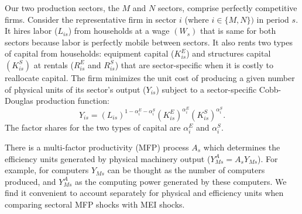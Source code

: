 \documentclass[12pt,fleqn]{article}
\begin{document}
{\normalsize Our two production sectors, the $M$ and $N$ sectors, comprise perfectly competitive firms. Consider the
representative firm in sector $i$ (where $i\in \{M,N\})$ in period $s$. It
hires labor ($L_{is}$) from households at a wage $\left( W_{s}\right) $ that
is same for both sectors because labor is perfectly mobile between sectors.
It also rents two types of capital from households: equipment capital ($%
K_{is}^{E}$) and structures capital $\left( K_{is}^{S}\right) $ at rentals ($%
R_{is}^{E}$ and $R_{is}^{S}$) that are sector-specific when it is costly
to reallocate capital. The firm minimizes the unit cost of producing a given
number of physical units of its sector's output ($Y_{is}$) subject to a
sector-specific Cobb-Douglas production function:
\begin{equation}
Y_{is}=\left( L_{is}\right) ^{1-\alpha _{i}^{E}-\alpha _{i}^{S}}\left(
K_{is}^{E}\right) ^{\alpha _{i}^{E}}\left( K_{is}^{S}\right) ^{\alpha
_{i}^{S}}.  \label{technology}
\end{equation}%
The factor shares for the two types of capital are $\alpha _{i}^{E}$ and $%
\alpha _{i}^{S}$. }

{\normalsize
}

{\normalsize There is a multi-factor productivity (MFP) process $A_s $ which
determines the efficiency units generated by physical machinery output ($%
Y_{Ms}^{A}=A_s Y_{Ms}$).
For example, for computers $Y_{Ms}$ can be thought
as the number of computers produced, and $Y_{Ms}^{A}$ as the computing power
generated by these computers. We find it convenient to account separately
for physical and efficiency units when comparing sectoral MFP shocks with
MEI shocks. }
\end{document}
